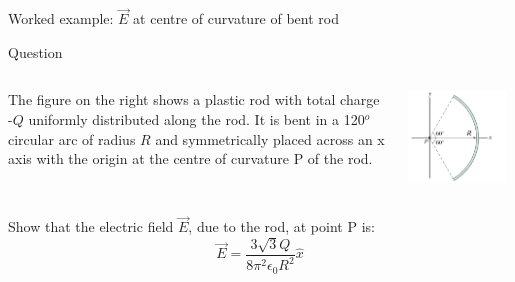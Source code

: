 {
\problemslide

\begin{frame}{Worked example: $\vec{E}$ at centre of curvature of bent rod}

\begin{blockexmplque}{Question}

  \begin{columns}
    \begin{column}{0.60\textwidth}
      The figure on the right shows a plastic rod with total charge -$Q$ uniformly
      distributed along the rod. It is bent in a 120$^o$ circular arc of radius $R$
      and symmetrically placed across an x axis with the origin at the
      centre of curvature P of the rod.
    \end{column}
    \begin{column}{0.40\textwidth}
      \begin{center}
          \includegraphics[width=0.95\textwidth]{./images/problems/lect01_plastic_rod_bent_circular_arc.png}
      \end{center}
    \end{column}
  \end{columns}
  \vspace{0.2cm}
  Show that the electric field $\vec{E}$, due to the rod, at point P is:
  \begin{equation*}
  		 \vec{E} = \frac{3\sqrt{3}Q}{8\pi^2 \epsilon_0 R^2} \hat{x}
  \end{equation*}
\end{blockexmplque}


\end{frame}}
